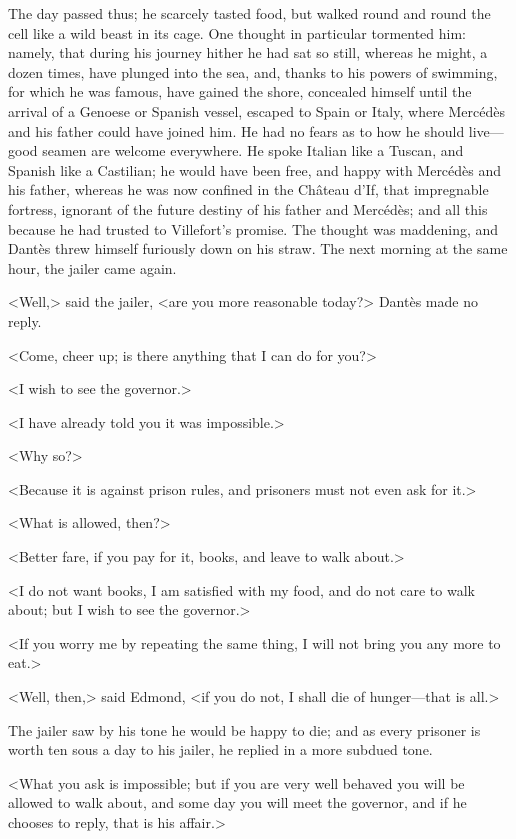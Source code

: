  The day passed thus; he scarcely tasted food, but walked round and round the cell like a wild beast in its cage. One thought in particular tormented him: namely, that during his journey hither he had sat so still, whereas he might, a dozen times, have plunged into the sea, and, thanks to his powers of swimming, for which he was famous, have gained the shore, concealed himself until the arrival of a Genoese or Spanish vessel, escaped to Spain or Italy, where Mercédès and his father could have joined him. He had no fears as to how he should live—good seamen are welcome everywhere. He spoke Italian like a Tuscan, and Spanish like a Castilian; he would have been free, and happy with Mercédès and his father, whereas he was now confined in the Château d'If, that impregnable fortress, ignorant of the future destiny of his father and Mercédès; and all this because he had trusted to Villefort's promise. The thought was maddening, and Dantès threw himself furiously down on his straw. The next morning at the same hour, the jailer came again. 

 <Well,> said the jailer, <are you more reasonable today?> Dantès made no reply. 

 <Come, cheer up; is there anything that I can do for you?> 

 <I wish to see the governor.> 

 <I have already told you it was impossible.> 

 <Why so?> 

 <Because it is against prison rules, and prisoners must not even ask for it.> 

 <What is allowed, then?> 

 <Better fare, if you pay for it, books, and leave to walk about.> 

 <I do not want books, I am satisfied with my food, and do not care to walk about; but I wish to see the governor.> 

 <If you worry me by repeating the same thing, I will not bring you any more to eat.> 

 <Well, then,> said Edmond, <if you do not, I shall die of hunger—that is all.> 

 The jailer saw by his tone he would be happy to die; and as every prisoner is worth ten sous a day to his jailer, he replied in a more subdued tone. 

 <What you ask is impossible; but if you are very well behaved you will be allowed to walk about, and some day you will meet the governor, and if he chooses to reply, that is his affair.> 

